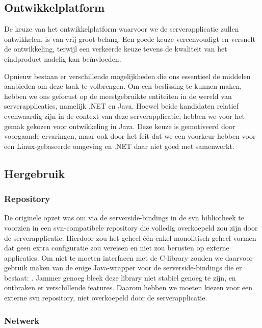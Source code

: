 \subsection{Ontwikkelplatform}

De keuze van het ontwikkelplatform waarvoor we de serverapplicatie zullen ontwikkelen, is van vrij groot belang. Een goede keuze vereenvoudigt en versnelt de ontwikkeling, terwijl een verkeerde keuze tevens de kwaliteit van het eindproduct nadelig kan beïnvloeden.

Opnieuw bestaan er verschillende mogelijkheden die ons essentieel de middelen aanbieden om deze taak te volbrengen. Om een beslissing te kunnen maken, hebben we ons gefocust op de meestgebruikte entiteiten in de wereld van serverapplicaties, namelijk .NET en Java. Hoewel beide kandidaten relatief evenwaardig zijn in de context van deze serverapplicatie, hebben we voor het gemak gekozen voor ontwikkeling in Java. Deze keuze is gemotiveerd door voorgaande ervaringen, maar ook door het feit dat we een voorkeur hebben voor een Linux-gebaseerde omgeving en .NET daar niet goed met samenwerkt.

\subsection{Hergebruik}

\subsubsection{Repository}

De originele opzet was om via de serverside-bindings in de \ac{svn} bibliotheek te voorzien in een \ac{svn}-compatibele repository die volledig overkoepeld zou zijn door de serverapplicatie. Hierdoor zou het geheel één enkel monolitisch geheel vormen dat geen extra configuratie zou vereisen en niet zou berusten op externe applicaties. Om niet te moeten interfacen met de C-library zouden we daarvoor gebruik maken van de enige Java-wrapper voor de serverside-bindings die er bestaat: . Jammer genoeg bleek deze library niet stabiel genoeg te zijn, en ontbraken er verschillende features. Daarom hebben we moeten kiezen voor een externe \ac{svn} repository, niet overkoepeld door de serverapplicatie.

\subsubsection{Netwerk}

